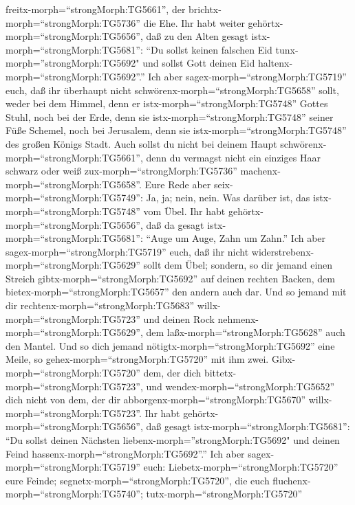 freitx-morph=``strongMorph:TG5661'', der
brichtx-morph=``strongMorph:TG5736'' die Ehe.  Ihr habt
weiter gehörtx-morph=``strongMorph:TG5656'', daß zu den Alten gesagt
istx-morph=``strongMorph:TG5681'': ``Du sollst keinen falschen Eid
tunx-morph=''strongMorph:TG5692" und sollst Gott deinen Eid
haltenx-morph=``strongMorph:TG5692''.''  Ich aber
sagex-morph=``strongMorph:TG5719'' euch, daß ihr überhaupt nicht
schwörenx-morph=``strongMorph:TG5658'' sollt, weder bei dem Himmel, denn
er istx-morph=``strongMorph:TG5748'' Gottes Stuhl,  noch
bei der Erde, denn sie istx-morph=``strongMorph:TG5748'' seiner Füße
Schemel, noch bei Jerusalem, denn sie istx-morph=``strongMorph:TG5748''
des großen Königs Stadt.  Auch sollst du nicht bei deinem
Haupt schwörenx-morph=``strongMorph:TG5661'', denn du vermagst nicht ein
einziges Haar schwarz oder weiß zux-morph=``strongMorph:TG5736''
machenx-morph=``strongMorph:TG5658''.  Eure Rede aber
seix-morph=``strongMorph:TG5749'': Ja, ja; nein, nein. Was darüber ist,
das istx-morph=``strongMorph:TG5748'' vom Übel.  Ihr habt
gehörtx-morph=``strongMorph:TG5656'', daß da gesagt
istx-morph=``strongMorph:TG5681'': ``Auge um Auge, Zahn um Zahn.''
 Ich aber sagex-morph=``strongMorph:TG5719'' euch, daß ihr
nicht widerstrebenx-morph=``strongMorph:TG5629'' sollt dem Übel;
sondern, so dir jemand einen Streich gibtx-morph=``strongMorph:TG5692''
auf deinen rechten Backen, dem bietex-morph=``strongMorph:TG5657'' den
andern auch dar.  Und so jemand mit dir
rechtenx-morph=``strongMorph:TG5683'' willx-morph=``strongMorph:TG5723''
und deinen Rock nehmenx-morph=``strongMorph:TG5629'', dem
laßx-morph=``strongMorph:TG5628'' auch den Mantel.  Und so
dich jemand nötigtx-morph=``strongMorph:TG5692'' eine Meile, so
gehex-morph=``strongMorph:TG5720'' mit ihm zwei. 
Gibx-morph=``strongMorph:TG5720'' dem, der dich
bittetx-morph=``strongMorph:TG5723'', und
wendex-morph=``strongMorph:TG5652'' dich nicht von dem, der dir
abborgenx-morph=``strongMorph:TG5670''
willx-morph=``strongMorph:TG5723''.  Ihr habt
gehörtx-morph=``strongMorph:TG5656'', daß gesagt
istx-morph=``strongMorph:TG5681'': ``Du sollst deinen Nächsten
liebenx-morph=''strongMorph:TG5692" und deinen Feind
hassenx-morph=``strongMorph:TG5692''.''  Ich aber
sagex-morph=``strongMorph:TG5719'' euch:
Liebetx-morph=``strongMorph:TG5720'' eure Feinde;
segnetx-morph=``strongMorph:TG5720'', die euch
fluchenx-morph=``strongMorph:TG5740''; tutx-morph=``strongMorph:TG5720''

